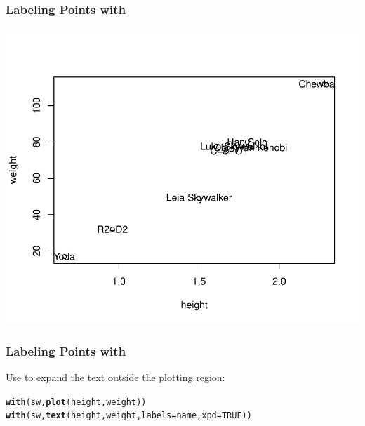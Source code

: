 \documentclass[12pt]{beamer}\usepackage[]{graphicx}\usepackage[]{color}
\makeatletter
\newcommand{\hlnum}[1]{\textcolor[rgb]{0.686,0.059,0.569}{#1}}%
\newcommand{\hlstd}[1]{\textcolor[rgb]{0.345,0.345,0.345}{#1}}%
\newcommand{\hlkwc}[1]{\textcolor[rgb]{0.333,0.667,0.333}{#1}}%
\newcommand{\hlkwd}[1]{\textcolor[rgb]{0.737,0.353,0.396}{\textbf{#1}}}%
\newenvironment{kframe}{%
 \def\at@end@of@kframe{}%
 \ifinner\ifhmode%
  \def\at@end@of@kframe{\end{minipage}}%
  \begin{minipage}{\columnwidth}%
 \fi\fi%
 \def\FrameCommand##1{\hskip\@totalleftmargin \hskip-\fboxsep
 \colorbox{shadecolor}{##1}\hskip-\fboxsep
     \hskip-\linewidth \hskip-\@totalleftmargin \hskip\columnwidth}%
 \MakeFramed {\advance\hsize-\width
   \@totalleftmargin\z@ \linewidth\hsize
   \@setminipage}}%
 {\par\unskip\endMakeFramed%
 \at@end@of@kframe}
\newenvironment{knitrout}{}{} %
\makeatother
\begin{document}

\begin{frame}[fragile]
\frametitle{Labeling Points with}

\begin{knitrout}\footnotesize
{}\color{fgcolor}

{\centering \includegraphics[width=.8\linewidth,height=.7\linewidth]{figure/sw_plot1-1} 

}



\end{knitrout}

\end{frame}


\begin{frame}[fragile]
\frametitle{Labeling Points with}

Use {\hilit {}} to expand the text outside the plotting region:
\begin{knitrout}\footnotesize
{}\color{fgcolor}\begin{kframe}
\begin{alltt}
\hlkwd{with}\hlstd{(sw,} \hlkwd{plot}\hlstd{(height, weight))}
\hlkwd{with}\hlstd{(sw,} \hlkwd{text}\hlstd{(height, weight,} \hlkwc{labels} \hlstd{= name,} \hlkwc{xpd} \hlstd{=} \hlnum{TRUE}\hlstd{))}
\end{alltt}
\end{kframe}
\end{knitrout}

\end{frame}
\end{document}
